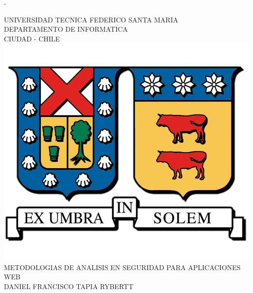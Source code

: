 %
%
% 
%
%
\begin{titlingpage}
\begin{SingleSpace}
\calccentering{\unitlength} 
\begin{adjustwidth*}{\unitlength}{-\unitlength}
\vspace*{13mm}
\begin{center}

{\Large UNIVERSIDAD TECNICA FEDERICO SANTA MARIA}\\[5mm]
{\Large DEPARTAMENTO DE INFORMATICA}\\
\vspace{4.5mm}
{\Large CIUDAD - CHILE}\\


\vspace{11mm}
\includegraphics[scale=0.4]{logos/utfsm_logo.png}\\
\vspace{11mm}
{\Large METODOLOGIAS DE ANALISIS EN SEGURIDAD PARA APLICACIONES WEB}\\[5mm]
\vspace{11mm}
{\Large\textsc{DANIEL FRANCISCO TAPIA RYBERTT}}\\


\end{center}
\end{adjustwidth*}
\end{SingleSpace}
\end{titlingpage}
